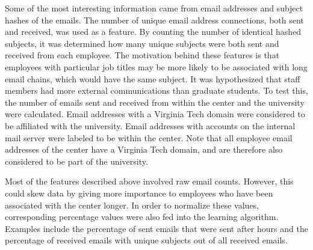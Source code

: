 \documentclass[12pt]{report}
\begin{document}
Some of the most interesting information came from email addresses and subject hashes of the emails.
The number of unique email address connections, both sent and received, was used as a feature.
By counting the number of identical hashed subjects, it was determined how many unique subjects were both sent and received from each employee.
The motivation behind these features is that employees with particular job titles may be more likely to be associated with long email chains, which would have the same subject.
It was hypothesized that staff members had more external communications than graduate students.
To test this, the number of emails sent and received from within the center and the university were calculated.
Email addresses with a Virginia Tech domain were considered to be affiliated with the university.
Email addresses with accounts on the internal mail server were labeled to be within the center.
Note that all employee email addresses of the center have a Virginia Tech domain, and are therefore also considered to be part of the university.


Most of the features described above involved raw email counts.
However, this could skew data by giving more importance to employees who have been associated with the center longer.
In order to normalize these values, corresponding percentage values were also fed into the learning algorithm.
Examples include the percentage of  sent emails that were sent after hours and the percentage of received emails with unique subjects out of all received emails.
\end{document}
